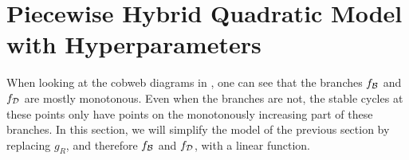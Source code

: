 \section{Piecewise Hybrid Quadratic Model with Hyperparameters}
\label{sec:setup.quad.hybrid}

When looking at the cobweb diagrams in , one can see that the branches $f_{\mathcal{B}}$ and $f_{\mathcal{D}}$ are mostly monotonous.
Even when the branches are not, the stable cycles at these points only have points on the monotonously increasing part of these branches.
In this section, we will simplify the model of the previous section by replacing $g_R$, and therefore $f_{\mathcal{B}}$ and $f_{\mathcal{D}}$, with a linear function.



